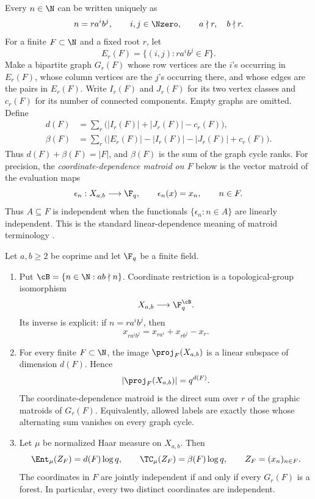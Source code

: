 Every $n\in\N$ can be written uniquely as
\[
 n=r a^i b^j,
 \qquad i,j\in\Nzero,
 \qquad a\nmid r,\quad b\nmid r.
\]
For a finite $F\subset\N$ and a fixed root $r$, let
\[
 E_r(F)=\{(i,j):r a^i b^j\in F\}.
\]
Make a bipartite graph $G_r(F)$ whose row vertices are the $i$'s occurring in
$E_r(F)$, whose column vertices are the $j$'s occurring there, and whose
edges are the pairs in $E_r(F)$.  Write $I_r(F)$ and $J_r(F)$ for its two
vertex classes and $c_r(F)$ for its number of connected components.  Empty
graphs are omitted.  Define
\begin{align}
 d(F)&=\sum_r\bigl(|I_r(F)|+|J_r(F)|-c_r(F)\bigr),
 \label{eq:dF}\\
 \beta(F)&=\sum_r\bigl(|E_r(F)|-|I_r(F)|-|J_r(F)|+c_r(F)\bigr).
 \label{eq:betaF}
\end{align}
Thus $d(F)+\beta(F)=|F|$, and $\beta(F)$ is the sum of the graph cycle ranks.
For precision, the \emph{coordinate-dependence matroid on $F$} below is the
vector matroid of the evaluation maps
\[
 \epsilon_n:X_{a,b}\longrightarrow\F_q,
 \qquad \epsilon_n(x)=x_n,\qquad n\in F.
\]
Thus $A\subseteq F$ is independent when the functionals
$\{\epsilon_n:n\in A\}$ are linearly independent.  This is the standard
linear-dependence meaning of matroid terminology \citep{Whitney1935}.

\begin{theorem}\label{thm:main}
Let $a,b\geq2$ be coprime and let $\F_q$ be a finite field.
\begin{enumerate}
\item Put $\cB=\{n\in\N:ab\nmid n\}$.  Coordinate restriction is a
topological-group isomorphism
\[
 X_{a,b}\longrightarrow\F_q^{\cB}.
\]
Its inverse is explicit: if $n=r a^i b^j$, then
\begin{equation}\label{eq:global-inverse-intro}
 x_{r a^i b^j}=x_{r a^i}+x_{r b^j}-x_r.
\end{equation}
\item For every finite $F\subset\N$, the image $\proj_F(X_{a,b})$ is a
linear subspace of dimension $d(F)$.  Hence
\begin{equation}\label{eq:finite-count-intro}
 |\proj_F(X_{a,b})|=q^{d(F)}.
\end{equation}
The coordinate-dependence matroid is the direct sum over $r$ of the graphic
matroids of $G_r(F)$.  Equivalently, allowed labels are exactly those whose
alternating sum vanishes on every graph cycle.
\item Let $\mu$ be normalized Haar measure on $X_{a,b}$.  Then
\begin{equation}\label{eq:haar-intro}
 \Ent_\mu(Z_F)=d(F)\log q,
 \qquad
 \TC_\mu(Z_F)=\beta(F)\log q,
 \qquad Z_F=(x_n)_{n\in F}.
\end{equation}
The coordinates in $F$ are jointly independent if and only if every
$G_r(F)$ is a forest.  In particular, every two distinct coordinates are
independent.
\end{enumerate}
\end{theorem}

